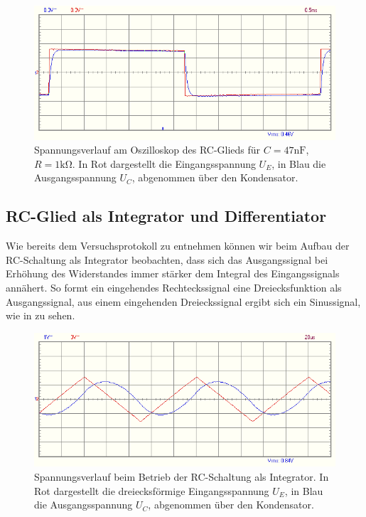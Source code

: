 \begin{figure}[H]
  \centering
  \includegraphics[width=.8\textwidth]{files/aufgabe1_rc_signalverlauf.png}
  \caption{Spannungsverlauf am Oszilloskop des RC-Glieds für $C = 47\si{\nano\farad}$, $R = 1 \si{\kilo\ohm}$. In Rot dargestellt die Eingangsspannung $U_E$, in Blau die Ausgangsspannung $U_C$, abgenommen über den Kondensator.}
  \label{fig:aufgabe1_rc_signalverlauf}
\end{figure}

\subsection{RC-Glied als Integrator und Differentiator}

Wie bereits dem Versuchsprotokoll zu entnehmen können wir beim Aufbau der RC-Schaltung als Integrator beobachten, dass sich das Ausgangssignal bei Erhöhung des Widerstandes immer stärker dem Integral des Eingangssignals annähert. So formt ein eingehendes Rechteckssignal eine Dreiecksfunktion als Ausgangssignal, aus einem eingehenden Dreieckssignal ergibt sich ein Sinussignal, wie in  zu sehen.

\begin{figure}[H]
  \centering
  \includegraphics[width=.8\textwidth]{files/aufgabe2_integral_dreieck.png}
  \caption{Spannungsverlauf beim Betrieb der RC-Schaltung als Integrator. In Rot dargestellt die dreiecksförmige Eingangsspannung $U_E$, in Blau die Ausgangsspannung $U_C$, abgenommen über den Kondensator.}
  \label{fig:aufgabe2_integral_dreieck}
\end{figure}

